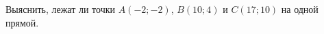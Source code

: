 \begin{ex}
	\begin{condition}
		Выяснить, лежат ли точки \( A(-2;-2) \), \( B(10;4) \) и \( C(17;10) \) на одной прямой.
	\end{condition}
\end{ex}